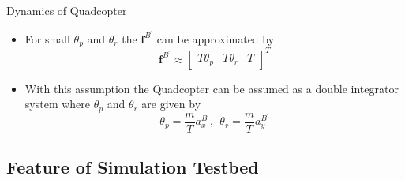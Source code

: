 \documentclass[10pt]{beamer}
\begin{document}
\begin{frame}{Dynamics of Quadcopter}
 \begin{itemize}
    \item For small $\theta_{p}$ and $\theta_{r}$ the $\mathbf{f}^{B^{\prime}}$ can be approximated by 
\begin{equation*}
\mathbf{f}^{B^{\prime}} \approx \begin{bmatrix}
T\theta_{p} & T\theta_{r} & T
\end{bmatrix}^{T}
\end{equation*} 
    \item With this assumption the Quadcopter can be assumed as a double integrator system where $\theta_{p}$ and $\theta_{r}$ are given by
    \begin{equation*}
        \theta_{p} = \dfrac{m}{T}a_{x}^{B^{\prime}},~~\theta_{r} = \dfrac{m}{T}a_{y}^{B^{\prime}}
    \end{equation*}
    \end{itemize}
\end{frame}
\subsection*{Feature of Simulation Testbed}
\end{document}
